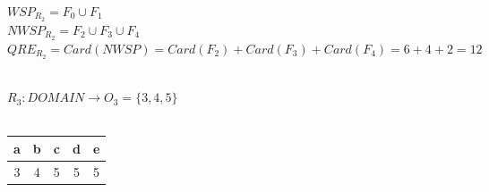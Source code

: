 		\noindent
		$WSP_{R_{2}} = F_{0} \cup F_{1} $ \\
		$NWSP_{R_{2}} = F_{2} \cup F_{3} \cup F_{4}$\\
		$QRE_{R_{2}} = Card(NWSP) = Card(F_{2}) + Card(F_{3}) +  Card(F_{4})= 6+4+2= 12 $
		\\\\
		
		\newpage
		
		\noindent
		$R_{3}: DOMAIN \rightarrow O_{3}=\{3,4,5\}$\\\\
		\begin{table}[h!]
			\begin{center}
				\begin{tabular}{|c|c|c|c|c|}
					\hline
					a & b & c & d & e \\
					\hline
					3 & 4 & 5 & 5 & 5 \\
					\hline
				\end{tabular}
			\end{center}
		\end{table}
		
